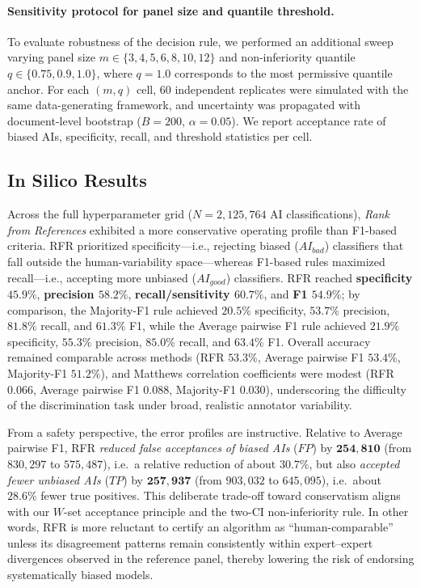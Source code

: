 \documentclass[12pt]{article}
\begin{document}
\paragraph{Sensitivity protocol for panel size and quantile threshold.}
To evaluate robustness of the decision rule, we performed an additional sweep varying panel size
\(m\in\{3,4,5,6,8,10,12\}\) and non-inferiority quantile \(q\in\{0.75,0.9,1.0\}\), where \(q=1.0\)
corresponds to the most permissive quantile anchor. For each \((m,q)\) cell, 60 independent replicates were
simulated with the same data-generating framework, and uncertainty was propagated with
document-level bootstrap (\(B=200\), \(\alpha=0.05\)). We report acceptance rate of biased AIs,
specificity, recall, and threshold statistics per cell.

\subsection{In Silico Results}

Across the full hyperparameter grid ($N=2{,}125{,}764$ AI classifications), \textit{Rank from References} exhibited a more conservative operating profile than F1-based criteria. RFR prioritized specificity---i.e., rejecting biased ($AI_{bad}$) classifiers that fall outside the human-variability space---whereas F1-based rules maximized recall---i.e., accepting more unbiased ($AI_{good}$) classifiers. RFR reached \textbf{specificity $45.9\%$}, \textbf{precision $58.2\%$}, \textbf{recall/sensitivity $60.7\%$}, and \textbf{F1 $54.9\%$}; by comparison, the Majority-F1 rule achieved $20.5\%$ specificity, $53.7\%$ precision, $81.8\%$ recall, and $61.3\%$ F1, while the Average pairwise F1 rule achieved $21.9\%$ specificity, $55.3\%$ precision, $85.0\%$ recall, and $63.4\%$ F1. Overall accuracy remained comparable across methods (RFR $53.3\%$, Average pairwise F1 $53.4\%$, Majority-F1 $51.2\%$), and Matthews correlation coefficients were modest (RFR $0.066$, Average pairwise F1 $0.088$, Majority-F1 $0.030$), underscoring the difficulty of the discrimination task under broad, realistic annotator variability.

From a safety perspective, the error profiles are instructive. Relative to Average pairwise F1, RFR \emph{reduced false acceptances of biased AIs} ($FP$) by $\mathbf{254{,}810}$ (from $830{,}297$ to $575{,}487$), i.e.\ a relative reduction of about \(30.7\%\), but also \emph{accepted fewer unbiased AIs} ($TP$) by $\mathbf{257{,}937}$ (from $903{,}032$ to $645{,}095$), i.e.\ about \(28.6\%\) fewer true positives. This deliberate trade-off toward conservatism aligns with our $W$-set acceptance principle and the two-CI non-inferiority rule. In other words, RFR is more reluctant to certify an algorithm as ``human-comparable'' unless its disagreement patterns remain consistently within expert--expert divergences observed in the reference panel, thereby lowering the risk of endorsing systematically biased models.
\end{document}

